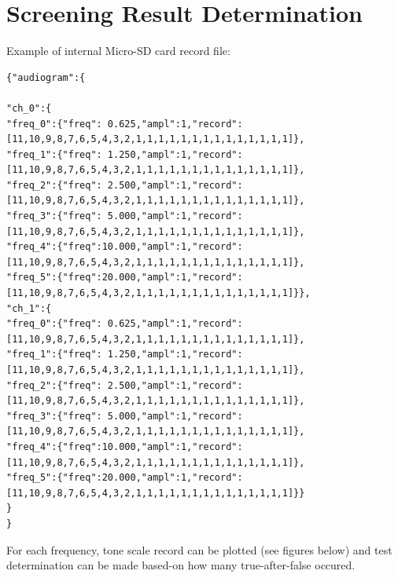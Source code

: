 \documentclass[a4paper,12pt,oneside,pdflatex,italian,final,twocolumn]{article}
\begin{document}
\newpage
\raggedright
\section{Screening Result Determination}

Example of internal Micro-SD card record file:

\begin{lstlisting}
{"audiogram":{

"ch_0":{
"freq_0":{"freq": 0.625,"ampl":1,"record":[11,10,9,8,7,6,5,4,3,2,1,1,1,1,1,1,1,1,1,1,1,1,1,1]},
"freq_1":{"freq": 1.250,"ampl":1,"record":[11,10,9,8,7,6,5,4,3,2,1,1,1,1,1,1,1,1,1,1,1,1,1,1]},
"freq_2":{"freq": 2.500,"ampl":1,"record":[11,10,9,8,7,6,5,4,3,2,1,1,1,1,1,1,1,1,1,1,1,1,1,1]},
"freq_3":{"freq": 5.000,"ampl":1,"record":[11,10,9,8,7,6,5,4,3,2,1,1,1,1,1,1,1,1,1,1,1,1,1,1]},
"freq_4":{"freq":10.000,"ampl":1,"record":[11,10,9,8,7,6,5,4,3,2,1,1,1,1,1,1,1,1,1,1,1,1,1,1]},
"freq_5":{"freq":20.000,"ampl":1,"record":[11,10,9,8,7,6,5,4,3,2,1,1,1,1,1,1,1,1,1,1,1,1,1,1]}},
"ch_1":{
"freq_0":{"freq": 0.625,"ampl":1,"record":[11,10,9,8,7,6,5,4,3,2,1,1,1,1,1,1,1,1,1,1,1,1,1,1]},
"freq_1":{"freq": 1.250,"ampl":1,"record":[11,10,9,8,7,6,5,4,3,2,1,1,1,1,1,1,1,1,1,1,1,1,1,1]},
"freq_2":{"freq": 2.500,"ampl":1,"record":[11,10,9,8,7,6,5,4,3,2,1,1,1,1,1,1,1,1,1,1,1,1,1,1]},
"freq_3":{"freq": 5.000,"ampl":1,"record":[11,10,9,8,7,6,5,4,3,2,1,1,1,1,1,1,1,1,1,1,1,1,1,1]},
"freq_4":{"freq":10.000,"ampl":1,"record":[11,10,9,8,7,6,5,4,3,2,1,1,1,1,1,1,1,1,1,1,1,1,1,1]},
"freq_5":{"freq":20.000,"ampl":1,"record":[11,10,9,8,7,6,5,4,3,2,1,1,1,1,1,1,1,1,1,1,1,1,1,1]}}
}
}
\end{lstlisting}

For each frequency, tone scale record can be plotted (see figures below)
and test determination can be made based-on how many true-after-false occured.
\end{document}
